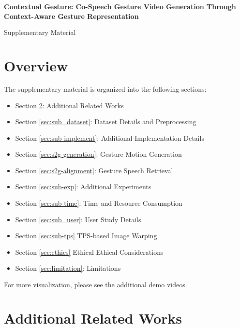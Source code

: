 \clearpage
\setcounter{page}{1}
\onecolumn
\appendix

\begin{center} 
    \centering
    \textbf{\large Contextual Gesture: Co-Speech Gesture Video Generation Through Context-Aware Gesture Representation}
\end{center}
\begin{center} 
    \centering
    \large Supplementary Material
\end{center}
 

\section{Overview}
\label{sec:Summary}
The supplementary material is organized into the following sections:
\begin{itemize}
    \item Section \ref{sec:sub_related}:  Additional Related Works
    \item Section \ref{sec:sub_dataset}:  Dataset Details and Preprocessing
    \item Section \ref{sec:sub-implement}: Additional Implementation Details
    \item Section \ref{sec:s2g-generation}: Gesture Motion Generation
    \item Section \ref{sec:s2g-alignment}: Gesture Speech Retrieval
    \item Section \ref{sec:sub-exp}: Additional Experiments
    \item Section \ref{sec:sub-time}: Time and Resource Consumption
    \item Section \ref{sec:sub_user}: User Study Details
    \item Section \ref{sec:sub-tps} TPS-based Image Warping
    \item Section \ref{sec:ethics} Ethical Ethical Considerations
    \item Section \ref{sec:limitation}: Limitations

    
\end{itemize}
For more visualization, please see the additional demo videos.


\section{Additional Related Works}
\label{sec:sub_related}
